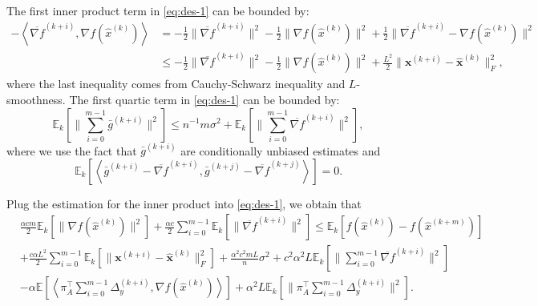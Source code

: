 \documentclass[10pt]{article}
\newcommand{\vx}{{\mathbf{x}}}
\newcommand{\EE}{\mathbb{E}}
\newcommand{\norm}[1]{\| #1 \|}
\newcommand{\ip}[1]{\left\langle#1\right\rangle}
\begin{document}
The first inner product term in \eqref{eq:des-1} can be bounded by:
\begin{align*}
    -\ip{\overline{\nabla f}^{(k+i)},\nabla f(\hat{x}^{(k)})} &=  -\frac{1}{2}\norm{\overline{\nabla f}^{(k+i)}}^2-\frac{1}{2}\norm{\nabla f(\hat{x}^{(k)})}^2+\frac{1}{2}\norm{\overline{\nabla f}^{(k+i)}-\nabla f(\hat{x}^{(k)})}^2\\
    &\le -\frac{1}{2}\norm{\overline{\nabla f}^{(k+i)}}^2-\frac{1}{2}\norm{\nabla f(\hat{x}^{(k)})}^2+\frac{L^2}{2}\norm{\vx^{(k+i)}-\hat{\vx}^{(k)}}_F^2,
\end{align*}
where the last inequality comes from Cauchy-Schwarz inequality and $L$-smoothness. The first quartic term in \eqref{eq:des-1} can be bounded by: 
\[\EE_k[\norm{\sum_{i=0}^{m-1}\bar{g}^{(k+i)}}^2]\le  n^{-1}m\sigma^2+\EE_k[\norm{\sum_{i=0}^{m-1}\overline{\nabla f}^{(k+i)}}^2],\]
where we use the fact that $\bar{g}^{(k+i)}$ are conditionally unbiased estimates and
\[\EE_k\left[\ip{\bar{g}^{(k+i)}-\overline{\nabla f}^{(k+i)},\bar{g}^{(k+j)}-\overline{\nabla f}^{(k+j)}}\right]=0.\]

Plug the estimation for the inner product into \eqref{eq:des-1}, we obtain that 
\begin{align}\label{eq:des-2}
    &\frac{\alpha cm}{2}\EE_k[\norm{\nabla f(\hat{x}^{(k)})}^2]+\frac{\alpha c}{2}\sum_{i=0}^{m-1}\EE_k[\norm{\overline{\nabla f}^{(k+i)}}^2]\le \EE_k[f(\hat{x}^{(k)})-f(\hat{x}^{(k+m)})]\\
    &+\frac{c\alpha L^2}{2}\sum_{i=0}^{m-1}\EE_k[\norm{\vx^{(k+i)}-\hat{\vx}^{(k)}}_F^2]+\frac{\alpha^2c^2mL}{n}\sigma^2+c^2\alpha^2L\EE_k[\norm{\sum_{i=0}^{m-1}\overline{\nabla f}^{(k+i)}}^2]\nonumber\\
    &-\alpha \EE\left[\ip{\pi_A^\top \sum_{i=0}^{m-1}\Delta_y^{(k+i)},\nabla f(\hat{x}^{(k)})}\right]+\alpha^2L\EE_k[\norm{\pi_A^\top\sum_{i=0}^{m-1}\Delta_y^{(k+i)}}^2]\nonumber.
\end{align}
\end{document}
